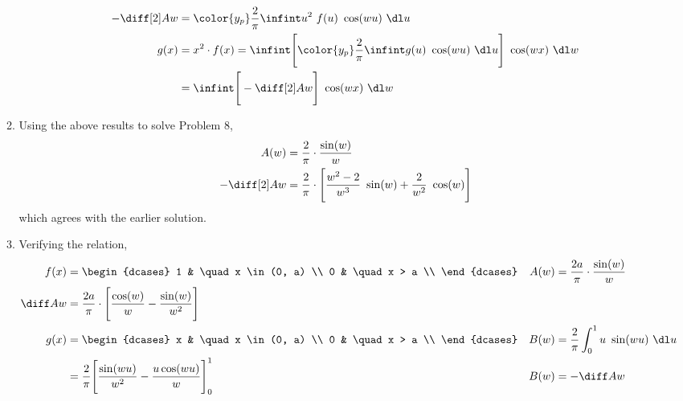 \begin{enumerate}
\begin{enumerate}
\begin{align}
                        -\diff[2] Aw & = \color{y_p}\frac{2}{\pi} \infint u^2\ f(u)
                        \ \cos(wu) \ \dl u                                            \\
                        g(x)         & = x^2 \cdot f(x) = \infint  \Bigg[{\color{y_p}
                                    \frac{2}{\pi} \infint g(u)\ \cos(wu)\ \dl u}
                        \Bigg]\ \cos(wx)\ \dl w                                       \\
                                     & = \infint \Bigg[ -\diff[2] Aw \Bigg]
                        \ \cos(wx)\ \dl w
                    \end{align}
              \item Using the above results to solve Problem $ 8 $,
                    \begin{align}
                        A(w)         & = \frac{2}{\pi}\cdot \frac{\sin(w)}{w} \\
                        -\diff[2] Aw & = \frac{2}{\pi} \cdot\Bigg[
                            \frac{w^2 - 2}{w^3}\ \sin(w) + \frac{2}{w^2}\ \cos(w) \Bigg]
                    \end{align}
                    which agrees with the earlier solution.

              \item Verifying the relation,
                    \begin{align}
                        f(x)       & = \begin{dcases}
                                           1 & \quad x \in (0, a) \\
                                           0 & \quad x > a        \\
                                       \end{dcases}                       &
                        A(w)       & = \frac{2a}{\pi} \cdot \frac{\sin(w)}{w}        \\
                        \diff Aw   & = \frac{2a}{\pi} \cdot \Bigg[ \frac{\cos(w)}{w}
                        - \frac{\sin(w)}{w^2} \Bigg]                                 \\
                        g(x)       & = \begin{dcases}
                                           x & \quad x \in (0, a) \\
                                           0 & \quad x > a        \\
                                       \end{dcases}                       &
                        B(w)       & = \frac{2}{\pi} \int_0^1 u\ \sin(wu)\ \dl u     \\
                                   & = \frac{2}{\pi} \Bigg[ \frac{\sin(wu)}{w^2}
                            - \frac{u\cos(wu)}{w}
                        \Bigg]_0^1 &
                        B(w)       & =  -\diff Aw
                    \end{align}


\end{enumerate}
\end{enumerate}
